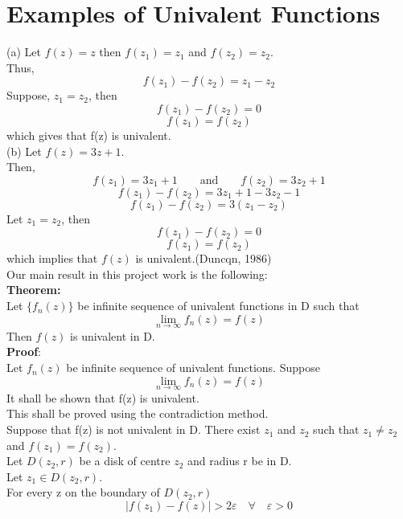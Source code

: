 \documentclass[a4paper, 12pt]{report}
\begin{document}
{\section{Examples of Univalent Functions}
(a) Let $f(z) = z$ then $f(z_1) = z_1$ and $f(z_2) = z_2$.\\
Thus,\\
\begin{equation*}
f(z_1) - f(z_2) = z_1 - z_2
\end{equation*}
Suppose, $z_1 = z_2$, then
\begin{equation*}
f(z_1) - f(z_2) = 0
\end{equation*}
\begin{equation*}
f(z_1) = f(z_2) 
\end{equation*}
which gives that f(z) is univalent.\\
(b) Let $f(z) = 3z + 1$.\\
Then,
\begin{equation}
f(z_1) = 3z_1 + 1 \qquad \text{and} \qquad f(z_2) = 3z_2 + 1
\end{equation}
\begin{equation*}
f(z_1) - f(z_2) = 3z_1 + 1 - 3z_2 - 1
\end{equation*}
\begin{equation*}
f(z_1) - f(z_2) = 3(z_1 - z_2)
\end{equation*}
Let $z_1 = z_2$, then
\begin{equation}
f(z_1) - f(z_2) = 0
\end{equation}
\begin{equation}
f(z_1) = f(z_2) 
\end{equation}
which implies that $f(z)$ is univalent.(Duncqn, 1986)\\
Our main result in this project work is the following:\\
\textbf{Theorem:}\\
Let $\{f_n(z)\}$ be infinite sequence of univalent functions in D such that 
\begin{equation*}
\lim_{n \to \infty}f_n(z) = f(z)
\end{equation*}
Then $f(z)$ is univalent in D.\\
\textbf{Proof}:\\
Let ${f_n(z)}$ be infinite sequence of univalent functions. Suppose
\begin{equation*}
\lim_{n \to \infty}f_n(z) = f(z)
\end{equation*}
It shall be shown that f(z) is univalent.\\
This shall be proved using the contradiction method.\\
Suppose that f(z) is not univalent in D. There exist $z_1$ and $z_2$ such that $z_1 \neq z_2$ and $f(z_1) = f(z_2)$.\\
Let $D(z_2, r)$ be a disk of centre $z_2$ and radius r be in D.\\
Let $z_1 \in D(z_2, r)$.\\
For every z on the boundary of $D(z_2, r)$
\begin{equation*}
|f(z_1) - f(z)| > 2\varepsilon\quad   \forall\quad  \varepsilon > 0
\end{equation*}

}
\end{document}
